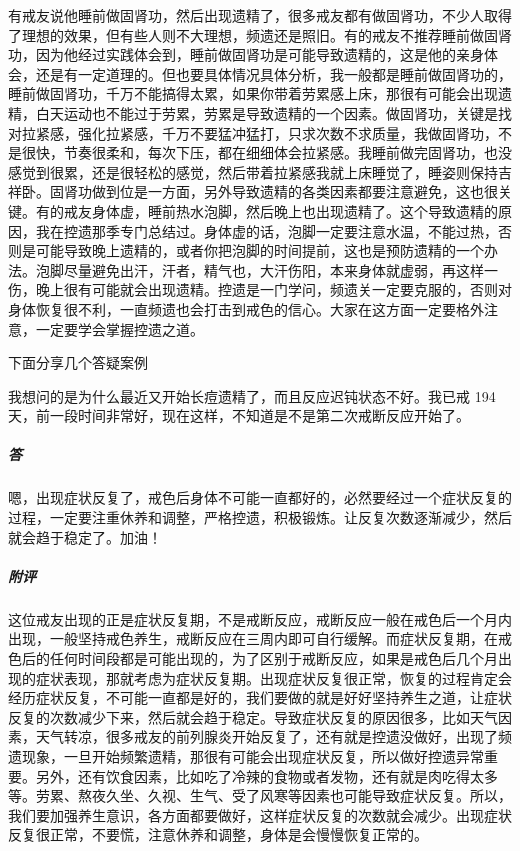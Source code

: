有戒友说他睡前做固肾功，然后出现遗精了，很多戒友都有做固肾功，不少人取得了理想的效果，但有些人则不大理想，频遗还是照旧。有的戒友不推荐睡前做固肾功，因为他经过实践体会到，睡前做固肾功是可能导致遗精的，这是他的亲身体会，还是有一定道理的。但也要具体情况具体分析，我一般都是睡前做固肾功的，睡前做固肾功，千万不能搞得太累，如果你带着劳累感上床，那很有可能会出现遗精，白天运动也不能过于劳累，劳累是导致遗精的一个因素。做固肾功，关键是找对拉紧感，强化拉紧感，千万不要猛冲猛打，只求次数不求质量，我做固肾功，不是很快，节奏很柔和，每次下压，都在细细体会拉紧感。我睡前做完固肾功，也没感觉到很累，还是很轻松的感觉，然后带着拉紧感我就上床睡觉了，睡姿则保持吉祥卧。固肾功做到位是一方面，另外导致遗精的各类因素都要注意避免，这也很关键。有的戒友身体虚，睡前热水泡脚，然后晚上也出现遗精了。这个导致遗精的原因，我在控遗那季专门总结过。身体虚的话，泡脚一定要注意水温，不能过热，否则是可能导致晚上遗精的，或者你把泡脚的时间提前，这也是预防遗精的一个办法。泡脚尽量避免出汗，汗者，精气也，大汗伤阳，本来身体就虚弱，再这样一伤，晚上很有可能就会出现遗精。控遗是一门学问，频遗关一定要克服的，否则对身体恢复很不利，一直频遗也会打击到戒色的信心。大家在这方面一定要格外注意，一定要学会掌握控遗之道。


下面分享几个答疑案例

\begin{case}
    我想问的是为什么最近又开始长痘遗精了，而且反应迟钝状态不好。我已戒 194 天，前一段时间非常好，现在这样，不知道是不是第二次戒断反应开始了。
    \subparagraph{答} 嗯，出现症状反复了，戒色后身体不可能一直都好的，必然要经过一个症状反复的过程，一定要注重休养和调整，严格控遗，积极锻炼。让反复次数逐渐减少，然后就会趋于稳定了。加油！
    \subparagraph{附评} 这位戒友出现的正是症状反复期，不是戒断反应，戒断反应一般在戒色后一个月内出现，一般坚持戒色养生，戒断反应在三周内即可自行缓解。而症状反复期，在戒色后的任何时间段都是可能出现的，为了区别于戒断反应，如果是戒色后几个月出现的症状表现，那就考虑为症状反复期。出现症状反复很正常，恢复的过程肯定会经历症状反复，不可能一直都是好的，我们要做的就是好好坚持养生之道，让症状反复的次数减少下来，然后就会趋于稳定。导致症状反复的原因很多，比如天气因素，天气转凉，很多戒友的前列腺炎开始反复了，还有就是控遗没做好，出现了频遗现象，一旦开始频繁遗精，那很有可能会出现症状反复，所以做好控遗异常重要。另外，还有饮食因素，比如吃了冷辣的食物或者发物，还有就是肉吃得太多等。劳累、熬夜久坐、久视、生气、受了风寒等因素也可能导致症状反复。所以，我们要加强养生意识，各方面都要做好，这样症状反复的次数就会减少。出现症状反复很正常，不要慌，注意休养和调整，身体是会慢慢恢复正常的。
\end{case}

